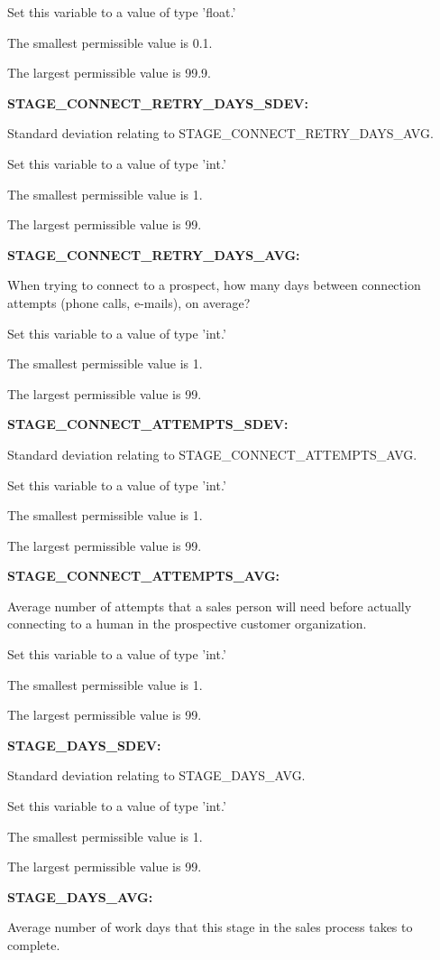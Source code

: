 Set this variable to a value of type 'float.'

The smallest permissible value is 0.1.

The largest permissible value is 99.9.


\textbf{STAGE\_CONNECT\_RETRY\_DAYS\_SDEV:}


Standard deviation relating to STAGE\_CONNECT\_RETRY\_DAYS\_AVG.

Set this variable to a value of type 'int.'

The smallest permissible value is 1.

The largest permissible value is 99.


\textbf{STAGE\_CONNECT\_RETRY\_DAYS\_AVG:}


When trying to connect to a prospect, how many days between connection attempts (phone calls, e-mails), on average?

Set this variable to a value of type 'int.'

The smallest permissible value is 1.

The largest permissible value is 99.


\textbf{STAGE\_CONNECT\_ATTEMPTS\_SDEV:}


Standard deviation relating to STAGE\_CONNECT\_ATTEMPTS\_AVG.

Set this variable to a value of type 'int.'

The smallest permissible value is 1.

The largest permissible value is 99.


\textbf{STAGE\_CONNECT\_ATTEMPTS\_AVG:}


Average number of attempts that a sales person will need before actually connecting to a human in the prospective customer organization.

Set this variable to a value of type 'int.'

The smallest permissible value is 1.

The largest permissible value is 99.


\textbf{STAGE\_DAYS\_SDEV:}


Standard deviation relating to STAGE\_DAYS\_AVG.

Set this variable to a value of type 'int.'

The smallest permissible value is 1.

The largest permissible value is 99.


\textbf{STAGE\_DAYS\_AVG:}


Average number of work days that this stage in the sales process takes to complete.

